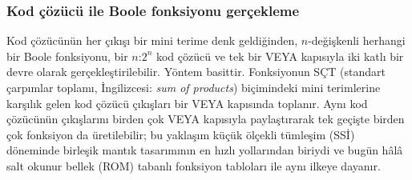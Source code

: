 \subsubsection{Kod çözücü ile Boole fonksiyonu gerçekleme}
Kod çözücünün her çıkışı bir mini terime denk geldiğinden, $n$-değişkenli herhangi bir Boole fonksiyonu, bir $n$:$2^n$ kod çözücü ve tek bir VEYA kapısıyla iki katlı bir devre olarak gerçekleştirilebilir. Yöntem basittir. Fonksiyonun SÇT (standart çarpımlar toplamı, İngilizcesi: \emph{sum of products}) biçimindeki mini terimlerine karşılık gelen kod çözücü çıkışları bir VEYA kapısında toplanır. Aynı kod çözücünün çıkışlarını birden çok VEYA kapısıyla paylaştırarak tek geçişte birden çok fonksiyon da üretilebilir; bu yaklaşım küçük ölçekli tümleşim (SSİ) döneminde birleşik mantık tasarımının en hızlı yollarından biriydi ve bugün hâlâ salt okunur bellek (ROM) tabanlı fonksiyon tabloları ile aynı ilkeye dayanır.

